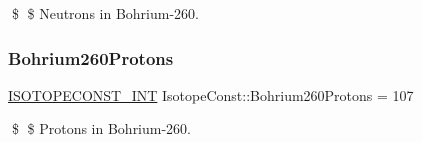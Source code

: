 \$ \$ Neutrons in Bohrium-\/260. \mbox{\label{group___isotope_const-_bohrium-_bh260_ga1d02d21b17e1528f30f0c0996a42364b}} 
\subsubsection{\texorpdfstring{Bohrium260\+Protons}{Bohrium260Protons}}
{\footnotesize\ttfamily \mbox{\hyperlink{group___isotope_const-_macros_ga5f18360b3e99483a35c32d789e62621c}{I\+S\+O\+T\+O\+P\+E\+C\+O\+N\+S\+T\+\_\+\+I\+NT}} Isotope\+Const\+::\+Bohrium260\+Protons = 107}

\$ \$ Protons in Bohrium-\/260. 